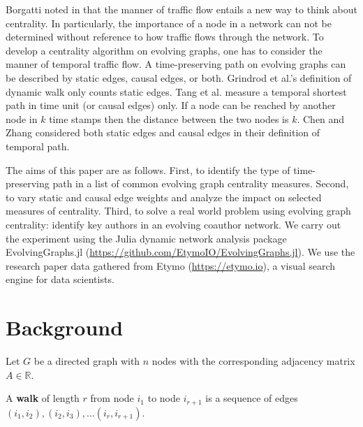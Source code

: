 \documentclass[12pt]{article}
\theoremstyle{definition}
\def\R{\mathbb{R}}
\begin{document}


Borgatti noted in \cite{borgatti05} that the manner of traffic flow entails a new way to think about centrality. In particularly, the importance of a node in a network can not be determined without reference to how traffic flows through the network.
To develop a centrality algorithm on evolving graphs, one has to consider the manner of temporal traffic flow.
A time-preserving path on evolving graphs can be described by static edges, causal edges, or both.
Grindrod et al.'s definition of dynamic walk \cite{grindrod11} only counts static edges.
Tang et al. \cite{tang10s} measure a temporal shortest path in time unit (or causal edges) only. If a node can be reached by another node in $k$ time stamps then the distance between the two nodes is $k$. Chen and Zhang \cite{chen16} considered both static edges and causal edges in their definition of temporal path.


The aims of this paper are as follows. First, to identify the type of time-preserving path in a list of common evolving graph centrality measures. Second, to vary static and causal edge weights and analyze the impact on selected measures of centrality.
Third, to solve a real world problem using evolving graph centrality: identify key authors in an evolving coauthor network.
We carry out the experiment using the Julia dynamic network analysis package
EvolvingGraphs.jl (\url{https://github.com/EtymoIO/EvolvingGraphs.jl}).
We use the research paper data gathered from Etymo (\url{https://etymo.io}), a visual search engine for data scientists.


\section{Background}
\label{sec:preliminaries}

Let $G$ be a directed graph with $n$ nodes with the corresponding adjacency matrix
$A \in \R$.

A \textbf{walk} of length $r$ from node $i_1$ to node $i_{r+1}$ is a sequence of edges
$(i_1, i_2), (i_2, i_3), \ldots (i_r, i_{r+1})$.
\end{document}

